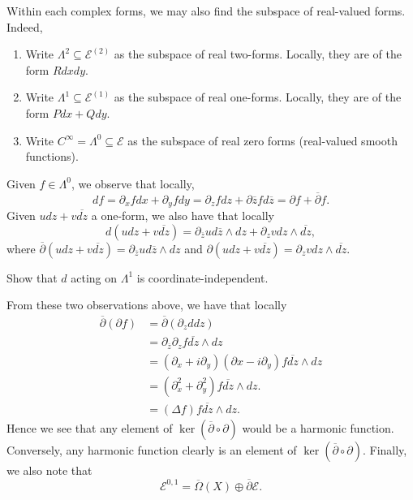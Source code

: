 \documentclass{article}
\begin{document}
{Within each complex forms, we may also find the subspace of real-valued forms. Indeed,
\begin{enumerate}
    \item Write $\Lambda^2 \subseteq \mathcal{E}^{(2)}$ as the subspace of real two-forms. Locally, they are of the form $R dx dy$.
    \item Write $\Lambda^1 \subseteq \mathcal{E}^{(1)}$ as the subspace of real one-forms. Locally, they are of the form $P dx + Q dy$.
    \item Write $C^\infty = \Lambda^0 \subseteq \mathcal{E}$ as the subspace of real zero forms (real-valued smooth functions).
\end{enumerate}

Given $f \in \Lambda^0$, we observe that locally,
\[df = \partial_x f dx + \partial_y f dy = \partial_z f dz + \partial \overline{z} f d\overline{z} = \partial f + \overline{\partial} f.\]
Given $u dz + v \overline{dz}$ a one-form, we also have that locally 
\[d(udz + v \overline{dz}) = \partial_{\overline{z}} u d\overline{z} \wedge dz + \partial_z v dz \wedge \overline{dz},\]
where $\overline{\partial}(udz + v \overline{dz}) = \partial_{\overline{z}} u d\overline{z} \wedge dz$ and $\partial(udz + v \overline{dz}) = \partial_z v dz \wedge \overline{dz}$.

\begin{exercise}
    Show that $d$ acting on $\Lambda^1$ is coordinate-independent.
\end{exercise}

From these two observations above, we have that locally
\begin{align*}
    \overline{\partial}(\partial f) &= \overline{\partial} (\partial_z d dz)\\
    &= \partial_{\overline{z}} \partial_z f \overline{dz} \wedge dz\\
    &= (\partial_x + i \partial_y) (\partial x - i \partial_y) f \overline{dz} \wedge dz\\
    &= (\partial^2_x + \partial^2_y) f \overline{dz} \wedge dz.\\
    &= (\Delta f) f \overline{dz} \wedge dz.
\end{align*}
Hence we see that any element of $\ker(\overline{\partial} \circ \partial)$ would be a harmonic function. Conversely, any harmonic function clearly is an element of $\ker(\overline{\partial} \circ \partial)$. Finally, we also note that
\[\mathcal{E}^{0, 1} = \overline{\Omega}(X) \oplus \overline{\partial} \mathcal{E}.\]

}
\end{document}
